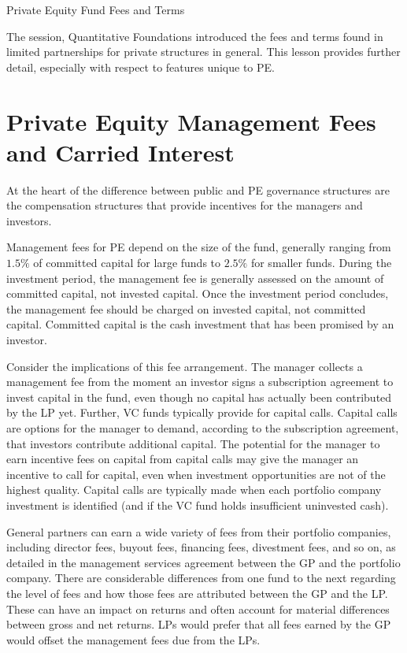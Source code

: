 \documentclass[11pt]{article}
\begin{document}
Private Equity Fund Fees and Terms

The session, Quantitative Foundations introduced the fees and terms found in limited partnerships for private structures in general. This lesson provides further detail, especially with respect to features unique to PE.

\section*{Private Equity Management Fees and Carried Interest}
At the heart of the difference between public and PE governance structures are the compensation structures that provide incentives for the managers and investors.

Management fees for PE depend on the size of the fund, generally ranging from $1.5 \%$ of committed capital for large funds to $2.5 \%$ for smaller funds. During the investment period, the management fee is generally assessed on the amount of committed capital, not invested capital. Once the investment period concludes, the management fee should be charged on invested capital, not committed capital. Committed capital is the cash investment that has been promised by an investor.

Consider the implications of this fee arrangement. The manager collects a management fee from the moment an investor signs a subscription agreement to invest capital in the fund, even though no capital has actually been contributed by the LP yet. Further, VC funds typically provide for capital calls. Capital calls are options for the manager to demand, according to the subscription agreement, that investors contribute additional capital. The potential for the manager to earn incentive fees on capital from capital calls may give the manager an incentive to call for capital, even when investment opportunities are not of the highest quality. Capital calls are typically made when each portfolio company investment is identified (and if the VC fund holds insufficient uninvested cash).

General partners can earn a wide variety of fees from their portfolio companies, including director fees, buyout fees, financing fees, divestment fees, and so on, as detailed in the management services agreement between the GP and the portfolio company. There are considerable differences from one fund to the next regarding the level of fees and how those fees are attributed between the GP and the LP. These can have an impact on returns and often account for material differences between gross and net returns. LPs would prefer that all fees earned by the GP would offset the management fees due from the LPs.
\end{document}
